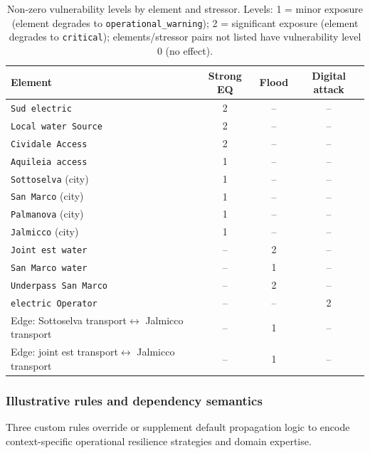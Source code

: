 \documentclass[review,12pt]{elsarticle}
\begin{document}
\begin{table}[H]
\centering
\caption{Non-zero vulnerability levels by element and stressor. Levels: 1 = minor exposure (element degrades to \texttt{operational\_warning}); 2 = significant exposure (element degrades to \texttt{critical}); elements/stressor pairs not listed have vulnerability level 0 (no effect).}
\label{tab:vulnerability}
\small
\begin{tabular}{lccc}
\toprule
\textbf{Element} & \textbf{Strong EQ} & \textbf{Flood} & \textbf{Digital attack} \\
\midrule
\texttt{Sud electric}          & 2 & -- & -- \\
\texttt{Local water Source}          & 2 & -- & -- \\
\texttt{Cividale Access}             & 2 & -- & -- \\
\texttt{Aquileia access}             & 1 & -- & -- \\
\texttt{Sottoselva} (city)           & 1 & -- & -- \\
\texttt{San Marco} (city)            & 1 & -- & -- \\
\texttt{Palmanova} (city)            & 1 & -- & -- \\
\texttt{Jalmicco} (city)             & 1 & -- & -- \\
\texttt{Joint est water}             & -- & 2 & -- \\
\texttt{San Marco water}             & -- & 1 & -- \\
\texttt{Underpass San Marco}         & -- & 2 & -- \\
\texttt{electric Operator}           & -- & -- & 2 \\
\midrule
Edge: Sottoselva transport$\leftrightarrow$ Jalmicco transport  & -- & 1 & -- \\
Edge: joint est transport$\leftrightarrow$ Jalmicco transport  & -- & 1 & -- \\

\bottomrule
\end{tabular}
\end{table}

\subsubsection{Illustrative rules and dependency semantics}
\label{subsubsec:case_rules}

Three custom rules override or supplement default propagation logic to encode
context-specific operational resilience strategies and domain expertise.
\end{document}
